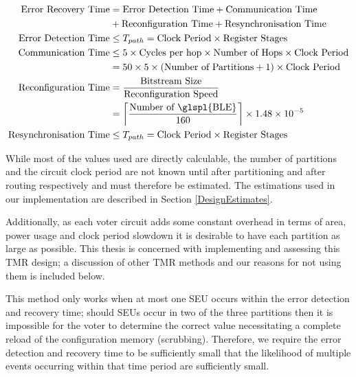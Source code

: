 \documentclass[12pt,final,oneside]{dwThesis} %
\begin{document}
   \begin{align}
      \mbox{Error Recovery Time} &=\mbox{Error Detection Time} +\mbox{Communication Time} \notag\\
      &+\mbox{Reconfiguration Time} + \mbox{Resynchronisation Time}\notag\\
      \mbox{Error Detection Time} &\le T_{path} = \mbox{Clock
         Period}\times\mbox{Register Stages}\notag\\
      \mbox{Communication Time}
      &\le 5\times \mbox{Cycles per hop}\times\mbox{Number of Hops}\times \mbox{Clock Period}\notag\\
      &= 50\times 5\times (\mbox{Number of
         Partitions}+1)\times \mbox{Clock Period}\notag\\
      \mbox{Reconfiguration
         Time} &= \frac{\mbox{Bitstream
            Size}}{\mbox{Reconfiguration Speed}}\notag\\
      &=\left\lceil \frac{\mbox{Number of
            \glspl{BLE}}}{160}\right\rceil\times 1.48\times10^{-5}\notag\\
      \mbox{Resynchronisation Time} &\le T_{path} = \mbox{Clock
         Period}\times\mbox{Register Stages}\notag\\
   \end{align}
   
   While most of the values used are directly calculable, the number of partitions and the circuit clock period are
   not known until after partitioning and after routing respectively and must therefore be estimated.
   The estimations used in our implementation are described in Section \ref{DesignEstimates}.


   Additionally, as each voter circuit adds some constant overhead in terms of
   area, power usage and clock period slowdown it is desirable to have each
   partition as large as possible. This thesis is concerned with implementing
   and assessing this \gls{TMR} design; a discussion of other \gls{TMR} methods
   and our reasons for not using them is included below.

   This method only works when at most one \gls{SEU} occurs within the error
   detection and recovery time; should \glspl{SEU} occur in two of the three
   partitions then it is impossible for the voter to determine the correct
   value necessitating a complete reload of the configuration memory
   (\gls{scrubbing}). Therefore, we require the error detection and recovery
   time to be sufficiently small that the likelihood of multiple events
   occurring within that time period are sufficiently small.
\end{document}

